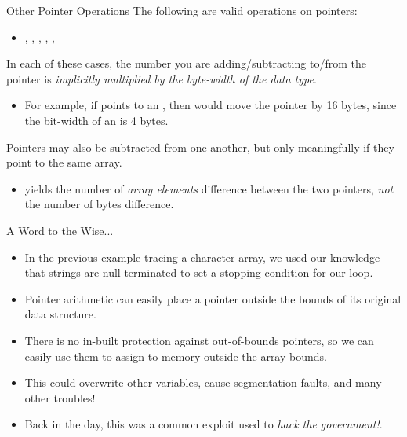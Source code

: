 \documentclass[11pt]{beamer}
\let\OldTexttt\texttt
\renewcommand{\texttt}[1]{\OldTexttt{\color{teal}{#1}}}
\begin{document}
\begin{frame}{Other Pointer Operations}
The following are valid operations on pointers:
\begin{itemize}
\item \texttt{++}, \texttt{--}, \texttt{+}, \texttt{-}, \texttt{+=}, \texttt{-=}
\end{itemize}
In each of these cases, the number you are adding/subtracting to/from the pointer is \emph{implicitly multiplied by the byte-width of the data type}.
\begin{itemize}
\item For example, if \texttt{ptr} points to an \texttt{int}, then \texttt{ptr += 4} would move the pointer by 16 bytes, since the bit-width of an \texttt{int} is 4 bytes.
\end{itemize}
Pointers may also be subtracted from one another, but only meaningfully if they point to the same array.
\begin{itemize}
\item \texttt{ptrA - ptrB} yields the number of \emph{array elements} difference between the two pointers, \emph{not} the number of bytes difference.
\end{itemize}
\end{frame}

\begin{frame}{A Word to the Wise...}
\begin{itemize}
\item In the previous example tracing a character array, we used our knowledge that strings are null terminated to set a stopping condition for our loop.
\item Pointer arithmetic can easily place a pointer outside the bounds of its original data structure.
\item There is no in-built protection against out-of-bounds pointers, so we can easily use them to assign to memory outside the array bounds.
\item This could overwrite other variables, cause segmentation faults, and many other troubles! 
\item Back in the day, this was a common exploit used to \emph{hack the government!}. 
\end{itemize}
\end{frame}
\end{document}
